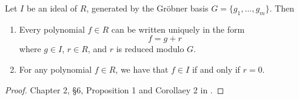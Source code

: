 \begin{comment}
\begin{theorem}
  \label{thm_groebner_basis_product}
  Let $I$ and $J$ be ideals of $R = K[x_1, \ldots, x_n]$, generated by Gr\"obner bases, say
  \begin{align*}
    I &= \pid{f_1, \ldots, f_m} \\
    J &= \pid{g_1, \ldots, g_n}.
  \end{align*}
  Then
  \[ \{ f_ig_j ~|~ 1 \leq i \leq m, 1 \leq j \leq n \} \]
  is a Gr\"obner basis for the ideal product $IJ$.
\end{theorem}
\begin{proof}
  \begin{align*}
    \LT(IJ)
      &= \pid{ \LT(h) ~|~ h \in IJ } \\
      &= \pid{ \LT(fg) ~|~ f \in I, g \in J } \\
      &= \pid{ \LT(f)\LT(g) ~|~ f \in I, g \in J } \\
      &= \pid{ \LT(f) ~|~ f \in I } \pid{ \LT(g) ~|~ g \in J } \\
      &= \LT(I) \LT(J) \\
      &= \pid{ \LT(f_i) ~|~ 1 \leq i \leq m } \pid{ \LT(g_j) ~|~ 1 \leq j \leq n } \\
      &= \pid{ \LT(f_i) \LT(g_j) ~|~ 1 \leq i \leq m, 1 \leq j \leq n } \\
      &= \pid{ \LT(f_i g_j) ~|~ 1 \leq i \leq m, 1 \leq j \leq n }
  \end{align*}
\end{proof}
\end{comment}

\begin{theorem}
  \label{thm_groebner_basis_remainder}
  Let $I$ be an ideal of $R$, generated by the Gr\"obner basis $G = \{ g_1, \ldots, g_m \}$. Then
  \begin{enumerate}[label=(\roman*)]
    \item
    Every polynomial $f \in R$ can be written uniquely in the form
    \begin{equation*}
      f = g + r
    \end{equation*}
    where $g \in I$, $r \in R$, and $r$ is reduced modulo $G$.

    \item
    For any polynomial $f \in R$, we have that $f \in I$ if and only if $r = 0$.
  \end{enumerate}
\end{theorem}
\begin{proof}
  Chapter 2, \S 6, Proposition 1 and Corollaey 2 in \cite{cox07}.
\end{proof}

